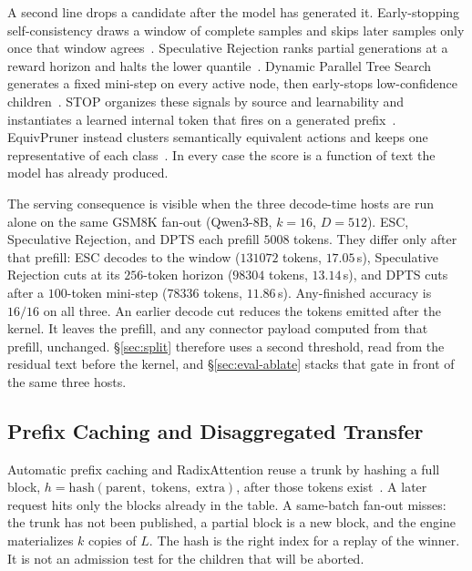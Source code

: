 A second line drops a candidate after the model has generated it.
Early-stopping self-consistency draws a window of complete samples and skips later samples only once that window agrees~\cite{esc,selfconsistency}.
Speculative Rejection ranks partial generations at a reward horizon and halts the lower quantile~\cite{specrej}.
Dynamic Parallel Tree Search generates a fixed mini-step on every active node, then early-stops low-confidence children~\cite{dpts}.
STOP organizes these signals by source and learnability and instantiates a learned internal token that fires on a generated prefix~\cite{stoploss}.
EquivPruner instead clusters semantically equivalent actions and keeps one representative of each class~\cite{equivpruner}.
In every case the score is a function of text the model has already produced.

The serving consequence is visible when the three decode-time hosts are run alone on the same GSM8K fan-out (Qwen3-8B, $k{=}16$, $D{=}512$).
ESC, Speculative Rejection, and DPTS each prefill $5008$ tokens.
They differ only after that prefill: ESC decodes to the window ($131072$ tokens, $17.05$\,s), Speculative Rejection cuts at its $256$-token horizon ($98304$ tokens, $13.14$\,s), and DPTS cuts after a $100$-token mini-step ($78336$ tokens, $11.86$\,s).
Any-finished accuracy is $16/16$ on all three.
An earlier decode cut reduces the tokens emitted after the kernel.
It leaves the prefill, and any connector payload computed from that prefill, unchanged.
\S\ref{sec:split} therefore uses a second threshold, read from the residual text before the kernel, and \S\ref{sec:eval-ablate} stacks that gate in front of the same three hosts.

\subsection{Prefix Caching and Disaggregated Transfer}
\label{sec:bg-pd}

Automatic prefix caching and RadixAttention reuse a trunk by hashing a full block, $h=\mathrm{hash}(\mathrm{parent},\;\mathrm{tokens},\;\mathrm{extra})$, after those tokens exist~\cite{vllm,sglang}.
A later request hits only the blocks already in the table.
A same-batch fan-out misses: the trunk has not been published, a partial block is a new block, and the engine materializes $k$ copies of $L$.
The hash is the right index for a replay of the winner.
It is not an admission test for the children that will be aborted.

